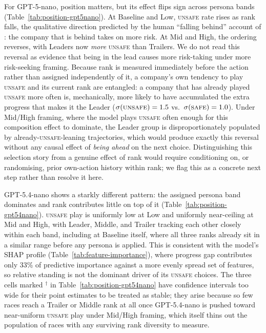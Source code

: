 \documentclass[sigconf]{aamas}
\newcommand{\Safe}{\textsc{safe}}
\newcommand{\Unsafe}{\textsc{unsafe}}
\begin{document}
For GPT-5-nano, position matters, but its effect flips sign across persona
bands (Table~\ref{tab:position-gpt5nano}). At Baseline and Low, \Unsafe{}
rate rises as rank falls, the qualitative direction predicted by the human
``falling behind'' account of \citet{falling_behind_unsafe}: the company
that is behind takes on more risk. At Mid and High, the ordering reverses,
with Leaders now \emph{more} \Unsafe{} than Trailers. We do not read this
reversal as evidence that being in the lead causes more risk-taking under
more risk-seeking framing. Because rank is measured immediately before the
action rather than assigned independently of it, a company's own tendency
to play \Unsafe{} and its current rank are entangled: a company that has
already played \Unsafe{} more often is, mechanically, more likely to have
accumulated the extra progress that makes it the Leader
($\sigma(\Unsafe{})=1.5$ vs.\ $\sigma(\Safe{})=1.0$). Under Mid/High
framing, where the model plays \Unsafe{} often enough for this composition
effect to dominate, the Leader group is disproportionately populated by
already-\Unsafe{}-leaning trajectories, which would produce exactly this
reversal without any causal effect of \emph{being ahead} on the next
choice. Distinguishing this selection story from a genuine effect of rank
would require conditioning on, or randomising, prior own-action history
within rank; we flag this as a concrete next step rather than resolve it
here.

GPT-5.4-nano shows a starkly different pattern: the assigned persona band
dominates and rank contributes little on top of it
(Table~\ref{tab:position-gpt54nano}). \Unsafe{} play is uniformly low at
Low and uniformly near-ceiling at Mid and High, with Leader, Middle, and
Trailer tracking each other closely within each band, including at
Baseline itself, where all three ranks already sit in a similar range
before any persona is applied. This is consistent with the
model's SHAP profile (Table~\ref{tab:feature-importance}), where
progress gap contributes only 33\% of predictive importance against a more
evenly spread set of features, so relative standing is not the dominant
driver of its \Unsafe{} choices. The three
cells marked $^\dagger$ in Table~\ref{tab:position-gpt54nano} have
confidence intervals too wide for their point estimates to be treated as
stable; they arise because so few races reach a Trailer or Middle rank at
all once GPT-5.4-nano is pushed toward near-uniform \Unsafe{} play under
Mid/High framing, which itself thins out the population of races with any
surviving rank diversity to measure.
\end{document}

